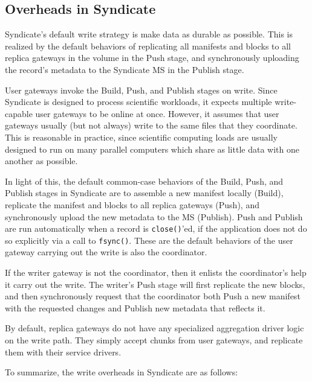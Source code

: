 \subsection{Overheads in Syndicate}

Syndicate's default write strategy is make data as durable as possible. 
This is realized by the default behaviors of replicating all
manifests and blocks to all replica gateways in the volume in the
Push stage, and synchronously uploading the record's metadata to the Syndicate
MS in the Publish stage.

User gateways invoke the Build, Push, and Publish stages on write.
Since Syndicate is designed to process scientific workloads, it expects
multiple write-capable user gateways to be online at once.  However, it assumes
that user gateways usually (but not always) write to the same files that they
coordinate.  This is reasonable in practice, since scientific computing loads
are usually designed to run on many parallel computers which share as little
data with one another as possible.

In light of this, the default common-case behaviors of the Build, Push, and
Publish stages in Syndicate are to assemble a new manifest locally (Build),
replicate the manifest and blocks to all replica gateways (Push), and
synchronously upload the new metadata to the MS (Publish).  Push and Publish are
run automatically when a record is \texttt{close()}'ed, if the application does
not do so explicitly via a call to \texttt{fsync()}.  These are the default
behaviors of the user gateway carrying out the write is also the coordinator.

If the writer gateway is not the coordinator, then it enlists the
coordinator's help it carry out the write.  The writer's Push stage will first
replicate the new blocks, and then synchronously request that the coordinator
both Push a new manifest with the requested changes
and Publish new metadata that reflects it.

By default, replica gateways do not have any specialized aggregation driver
logic on the write path.
They simply accept chunks from user gateways, and replicate them with
their service drivers.

To summarize, the write overheads in Syndicate are as follows:

